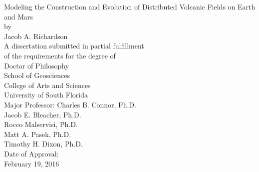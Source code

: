 \begin{titlepage}
\begin{center}
\singlespacing
{ \vspace*{\baselineskip} }
{ \vspace*{\baselineskip} }
{ \vspace*{\baselineskip} }
{ \vspace*{\baselineskip} }
Modeling the Construction and Evolution of Distributed Volcanic Fields on Earth and Mars\\
{ \vspace*{\baselineskip} }
{ \vspace*{\baselineskip} }
{ \vspace*{\baselineskip} }
by\\
{ \vspace*{\baselineskip} }
{ \vspace*{\baselineskip} }
{ \vspace*{\baselineskip} }
Jacob A. Richardson\\
{ \vspace*{\baselineskip} }
{ \vspace*{\baselineskip} }
{ \vspace*{\baselineskip} }
{ \vspace*{\baselineskip} }
A dissertation submitted in partial fulfillment\\
of the requirements for the degree of\\
Doctor of Philosophy\\
School of Geosciences\\
College of Arts and Sciences\\
University of South Florida\\
{ \vspace*{\baselineskip} }
{ \vspace*{\baselineskip} }
{ \vspace*{\baselineskip} }
Major Professor: Charles B. Connor, Ph.D.\\
Jacob E. Bleacher, Ph.D.\\
Rocco Malservisi, Ph.D.\\
Matt A. Pasek, Ph.D.\\
Timothy H. Dixon, Ph.D.\\
{ \vspace*{\baselineskip} }
{ \vspace*{\baselineskip} }
Date of Approval:\\
February 19, 2016\\

\end{center}
\end{titlepage}
